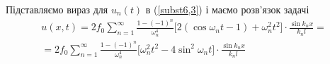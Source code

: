Підставляємо вираз для $u_n(t)$ в (\ref{subst6,3}) і маємо розв'язок задачі
\begin{equation}
    \begin{gathered}
        u(x,t) = 2f_0 \sum_{n=1}^\infty \frac{1 - (-1)^n}{\omega_n^4} \bigg[ 2(\cos\omega_nt - 1) +  \omega_n^2t^2\bigg] \cdot \frac{\sin k_nx}{k_nl} = \\
        =  2f_0 \sum_{n=1}^\infty \frac{1 - (-1)^n}{\omega_n^4} \bigg[\omega_n^2t^2 - 4\sin^2\omega_nt\bigg] \cdot \frac{\sin k_nx}{k_nl}
    \end{gathered}
\end{equation}

%
